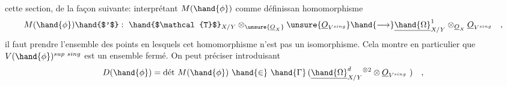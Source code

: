 cette section, de la façon suivante: interprétant $M(\hand{\phi})$ comme définissan
homomorphisme
\[
M(\hand{\phi})\hand{$'$} : \ \hand{$\mathcal{T}$}_{X/Y} \otimes_{\unsure{\underline{O}_X}} \unsure{\underline{O}_{V^{sing}}} \hand{\longrightarrow} \underline{\hand{\Omega}}^1_{X/Y} \otimes_{\underline{O}_X} \underline{O}_{V^{sing}} \quad ,
\]
il faut prendre l'ensemble des points en lesquels cet homomorphisme
n'est pas un isomorphisme. Cela montre en particulier que $V(\hand{\phi})^{sup\ sing}$
est un ensemble fermé. On peut  préciser  introduisant
\[
D(\hand{\phi}) = \text{dét}\ M(\hand{\phi}) \ \hand{\in} \ \hand{\Gamma}\,(\underline{\hand{\Omega}}^d_{X/Y}{}^{\otimes 2} \otimes \underline{O}_{V^{sing}}\ ) \quad ,
\]

